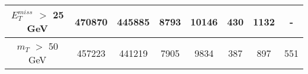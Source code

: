 \documentclass[10pt]{article}
\begin{document}
\begin{center}
\begin{table}[H]
\begin{adjustbox}{width=1\textwidth}
\begin{tabular}{cccccccc}
\multicolumn{1}{|c|}{$E_{T}^{miss}$ $>$ 25 GeV}  & \multicolumn{1}{c|}{470870} & \multicolumn{1}{c|}{445885} & \multicolumn{1}{c|}{8793} & \multicolumn{1}{c|}{10146} & \multicolumn{1}{c|}{430} & \multicolumn{1}{c|}{1132} & \multicolumn{1}{c|}{-}  \\ \hline 
\multicolumn{1}{|c|}{$m_{T}$ $>$ 50 GeV}  & \multicolumn{1}{c|}{457223} & \multicolumn{1}{c|}{441219} & \multicolumn{1}{c|}{7905} & \multicolumn{1}{c|}{9834} & \multicolumn{1}{c|}{387} & \multicolumn{1}{c|}{897} & \multicolumn{1}{c|}{551}  \\ \hline 
\end{tabular} 										
\end{adjustbox}										
\end{table} 											
\end{center}											
\end{document}
